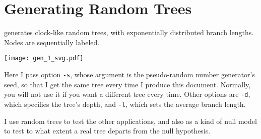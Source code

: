 \section{Generating Random Trees}
\label{sct_gen}

\gen{} generates clock-like random trees, with exponentially distributed branch
lengths. Nodes are sequentially labeled.


\begin{center}
\texttt{[image: gen\_1\_svg.pdf]}
\end{center}

\noindent{}Here I pass option \texttt{-s}, whose argument is the pseudo-random
number generator's seed, so that I get the same tree every time I produce this
document. Normally, you will not use it if you want a different tree every time.
Other options are \texttt{-d}, which specifies the tree's depth, and
\texttt{-l}, which sets the average branch length.

I use random trees to test the other applications, and also as a kind of null
model to test to what extent a real tree departs from the null hypothesis.
